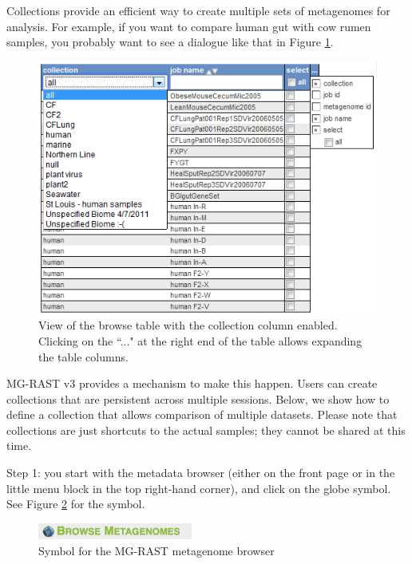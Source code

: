 \documentclass[12pt,fullpage]{report}
\begin{document}

Collections provide an efficient way to create multiple sets of metagenomes for analysis. For example, if you want to compare human gut with cow rumen samples, you probably want to see a dialogue like that in Figure \ref{fig:collections-total-list1}.

\begin{figure}[ht]
\begin{center}
\includegraphics[width=6in]{Images/collections-total-list1.png}
\end{center}
\caption{
View of the browse table with the collection column enabled. Clicking on the ``..." at the right end of the table allows expanding the table columns.
}
\label{fig:collections-total-list1}
\end{figure}


MG-RAST v3 provides a mechanism to make this happen. Users can create collections that are persistent across multiple sessions.
Below, we show how to define a collection that allows comparison of multiple datasets. Please note that collections are just shortcuts to the actual samples; they cannot be shared at this time.

Step 1: you start with the metadata browser (either on the front page or in the little menu block in the top right-hand corner), and click on the globe symbol. See Figure \ref{fig:browse-for-metagenomes} for the symbol.

\begin{figure}[ht]
\begin{center}
\includegraphics[width=2in]{Images/browse-for-metagenomes.png}
\end{center}
\caption{
Symbol for the MG-RAST metagenome browser}
\label{fig:browse-for-metagenomes}
\end{figure}
\end{document}
